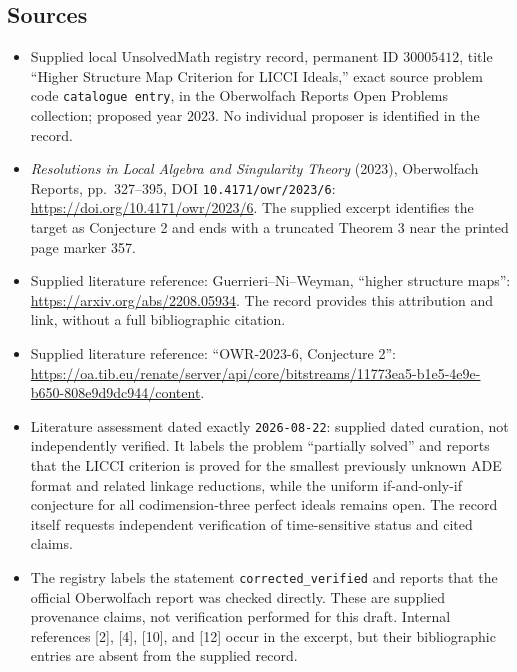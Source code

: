 \documentclass[11pt]{article}
\begin{document}
\subsection{Sources}
\begin{itemize}
\item Supplied local UnsolvedMath registry record, permanent ID \(30005412\), title ``Higher Structure Map Criterion for LICCI Ideals,'' exact source problem code \texttt{catalogue entry}, in the Oberwolfach Reports Open Problems collection; proposed year \(2023\). No individual proposer is identified in the record.
\item \emph{Resolutions in Local Algebra and Singularity Theory} (2023), Oberwolfach Reports, pp.\ 327--395, DOI \texttt{10.4171/owr/2023/6}: \url{https://doi.org/10.4171/owr/2023/6}. The supplied excerpt identifies the target as Conjecture 2 and ends with a truncated Theorem 3 near the printed page marker 357.
\item Supplied literature reference: Guerrieri--Ni--Weyman, ``higher structure maps'': \url{https://arxiv.org/abs/2208.05934}. The record provides this attribution and link, without a full bibliographic citation.
\item Supplied literature reference: ``OWR-2023-6, Conjecture 2'': \url{https://oa.tib.eu/renate/server/api/core/bitstreams/11773ea5-b1e5-4e9e-b650-808e9d9dc944/content}.
\item Literature assessment dated exactly \texttt{2026-08-22}: supplied dated curation, not independently verified. It labels the problem ``partially solved'' and reports that the LICCI criterion is proved for the smallest previously unknown ADE format and related linkage reductions, while the uniform if-and-only-if conjecture for all codimension-three perfect ideals remains open. The record itself requests independent verification of time-sensitive status and cited claims.
\item The registry labels the statement \texttt{corrected\_verified} and reports that the official Oberwolfach report was checked directly. These are supplied provenance claims, not verification performed for this draft. Internal references [2], [4], [10], and [12] occur in the excerpt, but their bibliographic entries are absent from the supplied record.
\end{itemize}
\end{document}

